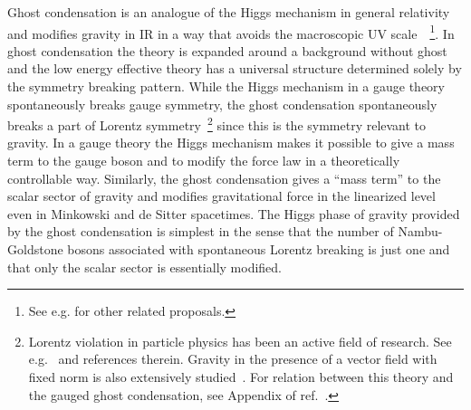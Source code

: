 Ghost condensation is an analogue of the Higgs mechanism in general
relativity and modifies gravity in IR in a way that avoids the
macroscopic UV scale~\cite{Arkani-Hamed:2003uy}~\footnote{
See
e.g.\cite{Rubakov:2004eb,Dubovsky:2004sg,Holdom:2004yx,Bluhm:2004ep,Bluhm:2006im,Kirsch:2005st,Cheng:2006us} 
for other related proposals. 
}. In ghost condensation the theory is expanded around a background
without ghost and the low energy effective theory has a universal
structure determined solely by the symmetry breaking pattern. While the
Higgs mechanism in a gauge theory spontaneously breaks gauge symmetry,
the ghost condensation spontaneously breaks a part of Lorentz
symmetry~\footnote{
Lorentz violation in particle physics has been an active field of
research. See
e.g.~\cite{Colladay:1998fq,Bluhm:2005uj,Mattingly:2005re,Amelino-Camelia:2005qa,Vucetich:2005ra} 
and references therein. Gravity in the presence of a vector field with
fixed norm is also extensively
studied~\cite{Jacobson:2000xp,Eling:2003rd,Jacobson:2004ts,Jacobson:2005bg,Kanno:2006ty}.
For relation between this theory and the gauged ghost condensation, see 
Appendix of ref.~\cite{Cheng:2006us}. 
}
since this is the symmetry relevant to gravity. In a gauge theory the
Higgs mechanism makes it possible to 
give a mass term to the gauge boson and to modify the force law in a
theoretically controllable way. Similarly, the ghost condensation gives
a ``mass term'' to the scalar sector of gravity and modifies
gravitational force in the linearized level even in Minkowski and de
Sitter spacetimes. The Higgs phase of gravity provided by the ghost
condensation is simplest in the sense that the number of Nambu-Goldstone
bosons associated with spontaneous Lorentz breaking is just one and that
only the scalar sector is essentially modified. 


